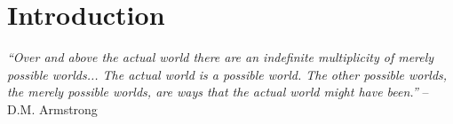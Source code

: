 \section{Introduction}\label{sec:intro}

{\em ``Over and above the actual world there are an indefinite multiplicity
of merely possible worlds... The actual world is a possible world. The other
possible worlds, the merely possible worlds, are ways that the actual world
might have been.''} \cite{Armstrong89:worlds} -- D.M. Armstrong

\vspace*{2mm}



